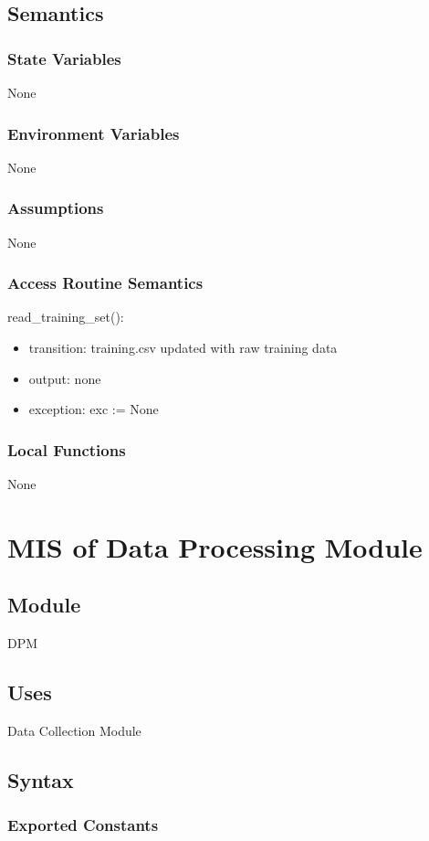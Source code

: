 \documentclass[12pt, titlepage]{article}
\begin{document}
\subsection{Semantics}
\subsubsection{State Variables}
None
\subsubsection{Environment Variables}
None
\subsubsection{Assumptions}
None
\subsubsection{Access Routine Semantics}
\noindent read\_training\_set():
\begin{itemize}
\item transition: training.csv updated with raw training data
\item output: none
\item exception: exc := None 
\end{itemize}
\subsubsection{Local Functions}
None

\newpage

\section{MIS of Data Processing Module} \label{Module} 
\subsection{Module}
DPM
\subsection{Uses}
Data Collection Module
\subsection{Syntax}
\subsubsection{Exported Constants}
\end{document}

